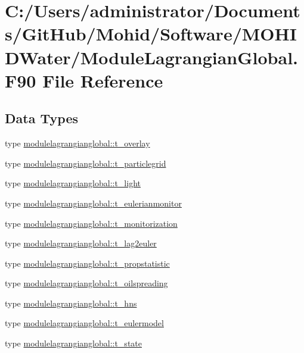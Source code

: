 \hypertarget{_module_lagrangian_global_8_f90}{}\section{C\+:/\+Users/administrator/\+Documents/\+Git\+Hub/\+Mohid/\+Software/\+M\+O\+H\+I\+D\+Water/\+Module\+Lagrangian\+Global.F90 File Reference}
\label{_module_lagrangian_global_8_f90}
\subsection*{Data Types}
\begin{DoxyCompactItemize}
\item 
type \mbox{\hyperlink{structmodulelagrangianglobal_1_1t__overlay}{modulelagrangianglobal\+::t\+\_\+overlay}}
\item 
type \mbox{\hyperlink{structmodulelagrangianglobal_1_1t__particlegrid}{modulelagrangianglobal\+::t\+\_\+particlegrid}}
\item 
type \mbox{\hyperlink{structmodulelagrangianglobal_1_1t__light}{modulelagrangianglobal\+::t\+\_\+light}}
\item 
type \mbox{\hyperlink{structmodulelagrangianglobal_1_1t__eulerianmonitor}{modulelagrangianglobal\+::t\+\_\+eulerianmonitor}}
\item 
type \mbox{\hyperlink{structmodulelagrangianglobal_1_1t__monitorization}{modulelagrangianglobal\+::t\+\_\+monitorization}}
\item 
type \mbox{\hyperlink{structmodulelagrangianglobal_1_1t__lag2euler}{modulelagrangianglobal\+::t\+\_\+lag2euler}}
\item 
type \mbox{\hyperlink{structmodulelagrangianglobal_1_1t__propstatistic}{modulelagrangianglobal\+::t\+\_\+propstatistic}}
\item 
type \mbox{\hyperlink{structmodulelagrangianglobal_1_1t__oilspreading}{modulelagrangianglobal\+::t\+\_\+oilspreading}}
\item 
type \mbox{\hyperlink{structmodulelagrangianglobal_1_1t__hns}{modulelagrangianglobal\+::t\+\_\+hns}}
\item 
type \mbox{\hyperlink{structmodulelagrangianglobal_1_1t__eulermodel}{modulelagrangianglobal\+::t\+\_\+eulermodel}}
\item 
type \mbox{\hyperlink{structmodulelagrangianglobal_1_1t__state}{modulelagrangianglobal\+::t\+\_\+state}}

\end{DoxyCompactItemize}
